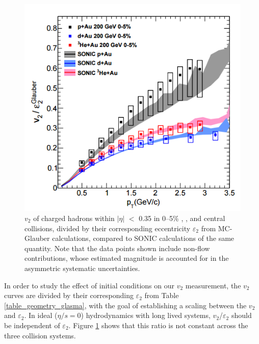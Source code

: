 \begin{figure}[!ht]
\begin{center}
\includegraphics[width=0.65\linewidth]{figs/v2_divided_epsilon_all_sys.PNG}
\caption{$v_2$ of charged hadrons within $|\eta|$ $<$ 0.35 in 0--5\% \pau,  \dau, and \hau central collisions, divided by their corresponding eccentricity $\varepsilon_2$ from MC-Glauber calculations, compared to SONIC calculations of the same quantity. Note that the data points shown include non-flow contributions, whose estimated magnitude is accounted for in the asymmetric systematic uncertainties.}
\label{fig:v2_divided_epsilon_all_sys}
\end{center}
\end{figure}

In order to study the effect of initial conditions on our $v_2$ measurement, the $v_2$ curves are divided by their corresponding $\varepsilon_2$ from Table \ref{table_geometry_glasma}, with the goal of establishing a scaling between the $v_2$ and $\varepsilon_2$. In ideal ($\eta/s=0$) hydrodynamics with long lived systems, $v_2$/$\varepsilon_2$ should be independent of $\varepsilon_2$. Figure \ref{fig:v2_divided_epsilon_all_sys} shows that this ratio is not constant across the three collision systems.

